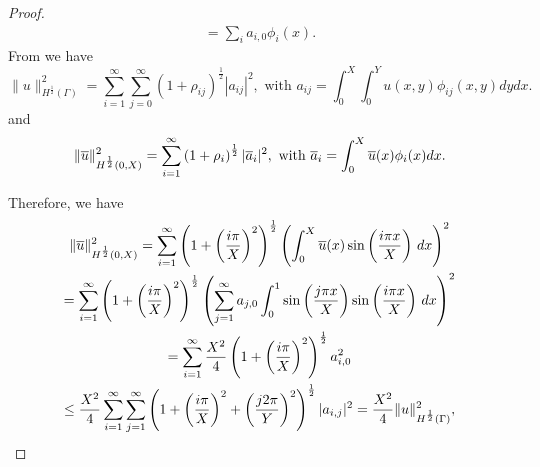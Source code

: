 \documentclass[r]{siamart171218}
\begin{document}
\begin{proof}
\begin{multline*}
=  \sum_{i} a_{i,0} \phi_{i}(x).
\end{multline*}
From \cite[Lemma 4.11]{chandler2015interpolation} we have
\begin{equation}\label{H12norm_Gamma}
\|u\|^2_{H^{\frac 12}(\Gamma)}=\sum_{i=1}^{\infty}\sum_{j=0}^{\infty} \left( 1+ \rho_{ij}\right)^{\frac 12}|a_{ij}|^2,
\text{ with }
a_{ij}=\int _0^X\int _0^{Y} u(x,y )\phi_{ij} (x,y)dy dx.
\end{equation}
and 
\begin{equation*}
\|\overline{u}\|^2_{H^{\frac 12}(0,X)}=\sum_{i=1}^{\infty} \left( 1+ \rho_{i}\right)^{\frac 12}|\overline{a}_i|^2,
\text{ with }
\overline{a}_i=\int _0^X \overline{u}(x )\phi_{i}(x) dx.
\end{equation*}

Therefore, we have
\begin{multline*}
\|\overline{u}\|^2_{H^{\frac 12}(0,X)}=
\sum_{i=1}^{\infty}\left( 1+ \left(\frac{i\pi}{X}\right)^2\right)^{\frac 12}\left( \int_0^X \overline{u}(x) \sin\left(\frac{i\pi x}{X}\right)\, dx \right)^2\\
= \sum_{i=1}^{\infty} \left( 1+ \left(\frac{i\pi}{X}\right)^2\right)^{\frac 12}\left( \sum_{j=1}^\infty a_{j,0}\int_0^1 \sin\left(\frac{j\pi x}{X}\right) \sin\left(\frac{i\pi x}{X}\right) \, dx  \right)^2\\
= \sum_{i=1}^{\infty} \frac{X^2}{4} \left( 1+ \left(\frac{i\pi}{X}\right)^2\right)^{\frac 12}a_{i,0}^2\\
\leq \frac{X^2}{4}\sum_{i=1}^{\infty} \sum_{j=1}^{\infty}  \left( 1+ \left(\frac{i\pi}{X}\right)^2 + \left(\frac{j2\pi}{Y}\right)^2\right)^{\frac 12} |a_{i,j}|^2 =\frac{X^2}{4}\|u\|^2_{H^{\frac 12}(\Gamma)},
\end{multline*}


\end{proof}
\end{document}
